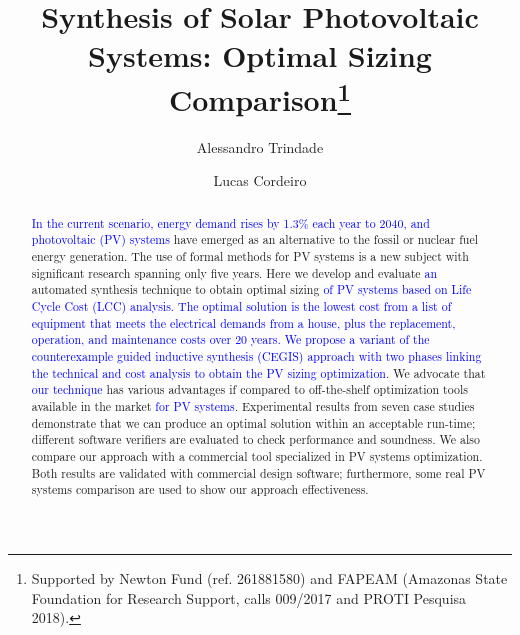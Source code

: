 \documentclass[runningheads]{llncs}
\begin{document}
%
\title{Synthesis of Solar Photovoltaic Systems: Optimal Sizing Comparison\thanks{Supported by Newton Fund (ref. 261881580) and FAPEAM (Amazonas State Foundation for Research Support, calls 009/2017 and PROTI Pesquisa 2018).}}
%
%
\author{Alessandro Trindade \and Lucas Cordeiro} %
%
%
\maketitle       %


\begin{abstract}
\textcolor{blue}{In the current scenario, energy demand rises by 1.3\% each year to 2040, and photovoltaic (PV) systems} have emerged as an alternative to the fossil or nuclear fuel energy generation. The use of formal methods for PV systems is a new subject with significant research spanning only five years. Here we develop and evaluate \textcolor{blue}{an} automated synthesis technique to obtain optimal sizing \textcolor{blue}{of PV systems based on Life Cycle Cost (LCC) analysis. The optimal solution is the lowest cost from a list of equipment that meets the electrical demands from a house, plus the replacement, operation, and maintenance costs over $20$ years. We propose a variant of the counterexample guided inductive synthesis (CEGIS) approach with two phases linking the technical and cost analysis to obtain the PV sizing optimization}. We advocate that \textcolor{blue}{our technique} has various advantages if compared to off-the-shelf optimization tools available in the market \textcolor{blue}{for PV systems}. Experimental results from seven case studies demonstrate that we can produce an optimal solution within an acceptable run-time; different software verifiers are evaluated to check performance and soundness. We also compare our approach with a commercial tool specialized in PV systems optimization. Both results are validated with commercial design software; furthermore, some real PV systems comparison are used to show our approach effectiveness. 
\end{abstract}
\end{document}
